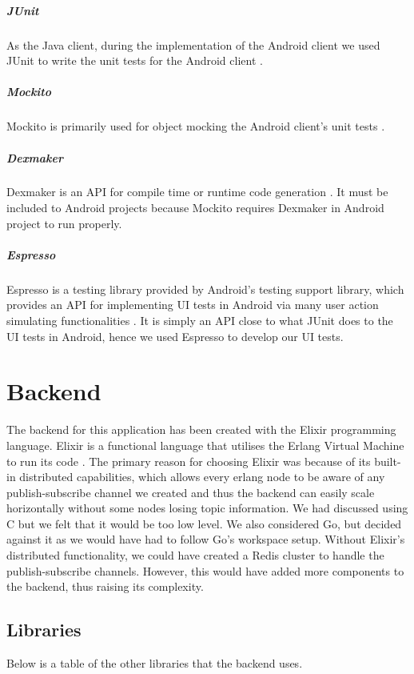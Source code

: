 \documentclass[11pt,a4paper]{report}
\begin{document}
\subparagraph{JUnit}
As the Java client, during the implementation of the Android client we used JUnit to write the unit tests for the Android client \cite{website:junit_homepage}.
\subparagraph{Mockito}
Mockito is primarily used for object mocking the Android client’s unit tests \cite {website:mockito_homepage}.
\subparagraph{Dexmaker}
Dexmaker is an API for compile time or runtime code generation \cite{website:dexmaker_homepage}. It must be included to Android projects because Mockito requires Dexmaker in Android project to run properly.
\subparagraph{Espresso}
Espresso is a testing library provided by Android’s testing support library, which provides an API for implementing UI tests in Android via many user action simulating functionalities \cite{website:espresso_homepage}. It is simply an API close to what JUnit does to the UI tests in Android, hence we used Espresso to develop our UI tests.

\section{Backend}

The backend for this application has been created with the Elixir programming language. Elixir is a functional language that utilises the Erlang Virtual Machine to run its code \cite{website:elixir_homepage}. The primary reason for choosing Elixir was because of its built-in distributed capabilities, which allows every erlang node to be aware of any publish-subscribe channel we created and thus the backend can easily scale horizontally without some nodes losing topic information. We had discussed using C but we felt that it would be too low level. We also considered Go, but decided against it as we would have had to follow Go's workspace setup.  Without Elixir's distributed functionality, we could have created a Redis cluster to handle the publish-subscribe channels. However, this would have added more components to the backend, thus raising its complexity.

\subsection{Libraries}

Below is a table of the other libraries that the backend uses.
\end{document}
